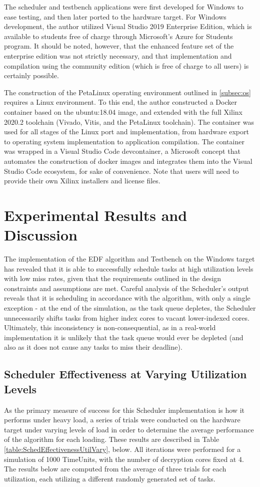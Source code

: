 The scheduler and testbench applications were first developed for Windows to ease testing, and then later ported to the hardware target. For Windows development, the author utilized Visual Studio 2019 Enterprise Edition, which is available to students free of charge through Microsoft's Azure for Students program. It should be noted, however, that the enhanced feature set of the enterprise edition was not strictly necessary, and that implementation and compilation using the community edition (which is free of charge to all users) is certainly possible.

The construction of the PetaLinux operating environment outlined in \ref{subsec:os} requires a Linux environment. To this end, the author constructed a Docker container based on the ubuntu:18.04 image, and extended with the full Xilinx 2020.2 toolchain (Vivado, Vitis, and the PetaLinux toolchain). The container was used for all stages of the Linux port and implementation, from hardware export to operating system implementation to application compilation. The container was wrapped in a Visual Studio Code devcontainer, a Microsoft concept that automates the construction of docker images and integrates them into the Visual Studio Code ecosystem, for sake of convenience. Note that users will need to provide their own Xilinx installers and license files.

\section{Experimental Results and Discussion}\label{sec:findings}
The implementation of the EDF algorithm and Testbench on the Windows target has revealed that it is able to successfully schedule tasks at high utilization levels with low miss rates, given that the requirements outlined in the design constraints and assumptions are met. Careful analysis of the Scheduler's output reveals that it is scheduling in accordance with the algorithm, with only a single exception - at the end of the simulation, as the task queue depletes, the Scheduler unnecessarily shifts tasks from higher index cores to vacant lower-indexed cores. Ultimately, this inconsistency is non-consequential, as in a real-world implementation it is unlikely that the task queue would ever be depleted (and also as it does not cause any tasks to miss their deadline).

\subsection{Scheduler Effectiveness at Varying Utilization Levels}\label{subsec:SchedulerDataUtilVary}
As the primary measure of success for this Scheduler implementation is how it performs under heavy load, a series of trials were conducted on the hardware target under varying levels of load in order to determine the average performance of the algorithm for each loading. These results are described in Table \ref{table:SchedEffectivenessUtilVary}, below. All iterations were performed for a simulation of 1000 TimeUnits, with the number of decryption cores fixed at 4. The results below are computed from the average of three trials for each utilization, each utilizing a different randomly generated set of tasks.

